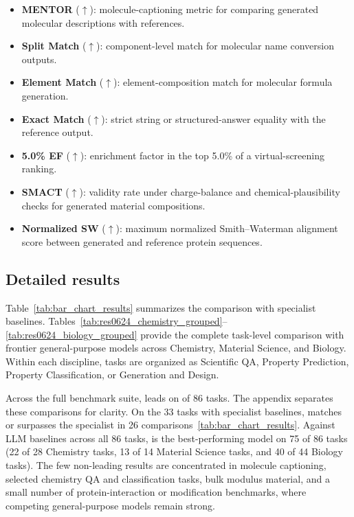 \begin{appendices}
\begin{itemize}
    \item \textbf{MENTOR} ($\uparrow$): molecule-captioning metric for comparing generated molecular descriptions with references.
    \item \textbf{Split Match} ($\uparrow$): component-level match for molecular name conversion outputs.
    \item \textbf{Element Match} ($\uparrow$): element-composition match for molecular formula generation.
    \item \textbf{Exact Match} ($\uparrow$): strict string or structured-answer equality with the reference output.
    \item \textbf{5.0\% EF} ($\uparrow$): enrichment factor in the top 5.0\% of a virtual-screening ranking.
    \item \textbf{SMACT} ($\uparrow$): validity rate under charge-balance and chemical-plausibility checks for generated material compositions.
    \item \textbf{Normalized SW} ($\uparrow$): maximum normalized Smith--Waterman alignment score between generated and reference protein sequences.
\end{itemize}

\subsection{Detailed results}\label{secB1_task_res}

\providecommand{\BestPerf}[1]{\textbf{#1}}
\providecommand{\SecBestPerf}[1]{\underline{#1}}

\setlength{\tabcolsep}{1pt}

Table~\ref{tab:bar_chart_results} summarizes the comparison with specialist baselines. Tables~\ref{tab:res0624_chemistry_grouped}--\ref{tab:res0624_biology_grouped} provide the complete task-level comparison with frontier general-purpose models across Chemistry, Material Science, and Biology. Within each discipline, tasks are organized as Scientific QA, Property Prediction, Property Classification, or Generation and Design.

Across the full benchmark suite, \projName{} leads on \textbf{\totalSOTATasks{}} of 86 tasks. The appendix separates these comparisons for clarity. On the 33 tasks with specialist baselines, \projName{} matches or surpasses the specialist in 26 comparisons~\ref{tab:bar_chart_results}. Against LLM baselines across all 86 tasks, \projName{} is the best-performing model on 75 of 86 tasks (22 of 28 Chemistry tasks, 13 of 14 Material Science tasks, and 40 of 44 Biology tasks). The few non-leading results are concentrated in molecule captioning, selected chemistry QA and classification tasks, bulk modulus material, and a small number of protein-interaction or modification benchmarks, where competing general-purpose models remain strong.


\end{appendices}
